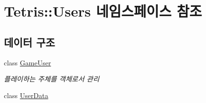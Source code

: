 \hypertarget{namespace_tetris_1_1_users}{}\section{Tetris\+:\+:Users 네임스페이스 참조}
\label{namespace_tetris_1_1_users}
\subsection*{데이터 구조}
\begin{DoxyCompactItemize}
\item 
class \hyperlink{class_tetris_1_1_users_1_1_game_user}{Game\+User}
\begin{DoxyCompactList}\small\item\em 플레이하는 주체를 객체로서 관리 \end{DoxyCompactList}\item 
class \hyperlink{class_tetris_1_1_users_1_1_user_data}{User\+Data}
\end{DoxyCompactItemize}
